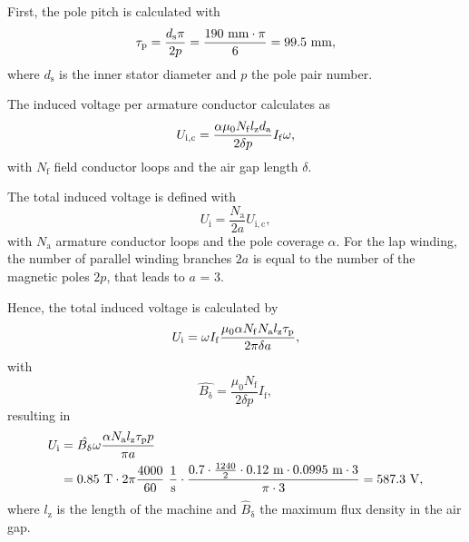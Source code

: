 \begin{solutionblock}
	First, the pole pitch is calculated with
	\begin{equation}
		\taup = \frac{d_{\mathrm{s}} \pi}{2 p}
		= \frac{190 \ \si{mm} \cdot \pi}{6}
		= 99.5 \ \si{mm},
	\end{equation}
	where $d_{\mathrm{s}}$ is the inner stator diameter and $p$ the pole pair number.

	The induced voltage per armature conductor calculates as
	\begin{equation}
		U_{\mathrm{i,c}} = \frac{\alpha\mu_{\mathrm{0}} N_{\mathrm{f}} \lz d_{\mathrm{a}}}{2 \delta p} I_{\mathrm{f}} \omega,
	\end{equation}
	with $N_{\mathrm{f}}$ field conductor loops and the air gap length $\delta$.

	The total induced voltage is defined with
	\begin{equation}
		U_{\mathrm{i}} = \frac{N_{\mathrm{a}}}{2a} U_{\mathrm{i,c}},
	\end{equation}
	with $N_{\mathrm{a}}$ armature conductor loops and the pole coverage $\alpha$.
	For the lap winding, the number of parallel winding branches $2a$ is equal to the number of the magnetic poles $2p$, that leads to $a$ = 3.

	Hence, the total induced voltage is calculated by
	\begin{equation}
		U_{\mathrm{i}} = \omega I_{\mathrm{f}} \frac{\mu_{\mathrm{0}} \alpha N_{\mathrm{f}} N_{\mathrm{a}} \lz \taup}{2 \pi \delta a},
	\end{equation}
	with
	\begin{equation}
		\hat{B_{\updelta}} = \frac{\mu_{\mathrm{0}} N_{\mathrm{f}}}{2 \delta p} I_{\mathrm{f}},
		\label{eq:B_hat_task1}
	\end{equation}
	resulting in
	\begin{align}
		\begin{split}
			U_{\mathrm{i}} & = \hat{B_{\updelta}} \omega \frac{\alpha N_{\mathrm{a}} \lz \taup p}{\pi a}                                                                                        \\
			               & = 0.85 \ \si{T} \cdot 2\pi \frac{4000}{60} \ \si{\frac{1}{s}} \cdot \frac{0.7 \cdot \frac{1240}{2} \cdot 0.12 \ \si{m} \cdot 0.0995 \ \si{m} \cdot 3}{\pi \cdot 3}
			= 587.3 \ \si{V},
		\end{split}
	\end{align}
	where $l_{\mathrm{z}}$ is the length of the machine and $\hat{B}_{\updelta}$ the maximum flux density in the air gap.

\end{solutionblock}

